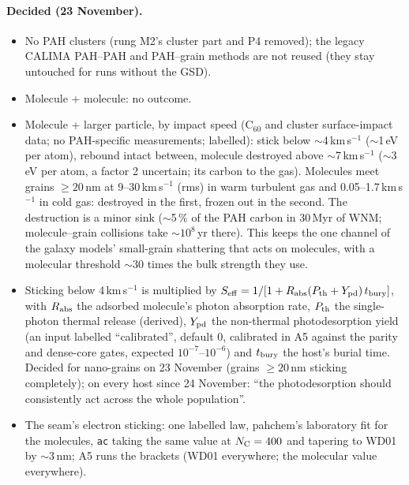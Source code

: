 \documentclass[11pt,a4paper]{article}
\newcommand{\NC}{N_{\rm C}}
\begin{document}
\paragraph{Decided (23 November).}
\begin{itemize}
\item No PAH clusters (rung M2's cluster part and P4 removed); the legacy CALIMA PAH--PAH and PAH--grain methods are not
  reused (they stay untouched for runs without the GSD).
\item Molecule + molecule: no outcome.
\item Molecule + larger particle, by impact speed (C$_{60}$ and cluster surface-impact data; no PAH-specific measurements;
  labelled): stick below $\sim$4\,km\,s$^{-1}$ ($\sim$1\,eV per atom), rebound intact between, molecule destroyed above
  $\sim$7\,km\,s$^{-1}$ ($\sim$3\,eV per atom, a factor 2 uncertain; its carbon to the gas). Molecules meet grains
  $\ge20$\,nm at 9--30\,km\,s$^{-1}$ (rms) in warm turbulent gas and 0.05--1.7\,km\,s$^{-1}$ in cold gas: destroyed in the
  first, frozen out in the second. The destruction is a minor sink ($\sim$5\,\% of the PAH carbon in 30\,Myr of WNM;
  molecule--grain collisions take $\sim10^8$\,yr there). This keeps the one channel of the galaxy models' small-grain
  shattering that acts on molecules, with a molecular threshold $\sim$30 times the bulk strength they use.
\item Sticking below 4\,km\,s$^{-1}$ is multiplied by $S_{\rm eff} = 1/[1 + R_{\rm abs}
  (P_{\rm th} + Y_{\rm pd})\,t_{\rm bury}]$, with $R_{\rm abs}$ the adsorbed molecule's photon absorption rate, $P_{\rm th}$
  the single-photon thermal release (derived), $Y_{\rm pd}$ the non-thermal photodesorption yield (an input labelled
  ``calibrated'', default 0, calibrated in A5 against the parity and dense-core gates, expected $10^{-7}$--$10^{-6}$) and
  $t_{\rm bury}$ the host's burial time. Decided for nano-grains on 23 November (grains $\ge20$\,nm sticking
  completely); on every host since 24 November: ``the photodesorption should consistently act across the whole
  population''.
\item The seam's electron sticking: one labelled law, pahchem's laboratory fit for the molecules, \texttt{ac} taking the
  same value at $\NC = 400$ and tapering to WD01 by $\sim$3\,nm; A5 runs the brackets (WD01 everywhere; the molecular
  value everywhere).
\end{itemize}
\end{document}
